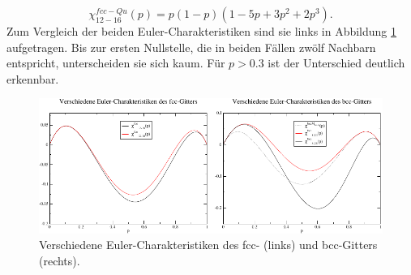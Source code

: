 \begin{equation}
  \chi^{fcc-Qu}_{12-16}(p)=p(1-p)(1-5p+3p^2+2p^3).
\end{equation}
Zum Vergleich der beiden Euler-Charakteristiken sind sie links in Abbildung \ref{fig:fcc+bccplot} aufgetragen. Bis zur ersten Nullstelle, die in beiden F\"allen zw\"olf Nachbarn entspricht, unterscheiden sie sich kaum. F\"ur $p>0.3$ ist der Unterschied deutlich erkennbar.
\begin{figure}[htbp]
  \centering
  \includegraphics{./Schranken-figs/chiplot}
  \caption{Verschiedene Euler-Charakteristiken des fcc- (links) und bcc-Gitters (rechts).}
  \label{fig:fcc+bccplot}
\end{figure}

